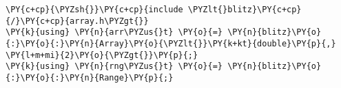 \begin{Verbatim}[commandchars=\\\{\}]
\PY{c+cp}{\PYZsh{}}\PY{c+cp}{include \PYZlt{}blitz}\PY{c+cp}{/}\PY{c+cp}{array.h\PYZgt{}}
\PY{k}{using} \PY{n}{arr\PYZus{}t} \PY{o}{=} \PY{n}{blitz}\PY{o}{:}\PY{o}{:}\PY{n}{Array}\PY{o}{\PYZlt{}}\PY{k+kt}{double}\PY{p}{,} \PY{l+m+mi}{2}\PY{o}{\PYZgt{}}\PY{p}{;}
\PY{k}{using} \PY{n}{rng\PYZus{}t} \PY{o}{=} \PY{n}{blitz}\PY{o}{:}\PY{o}{:}\PY{n}{Range}\PY{p}{;}
\end{Verbatim}
